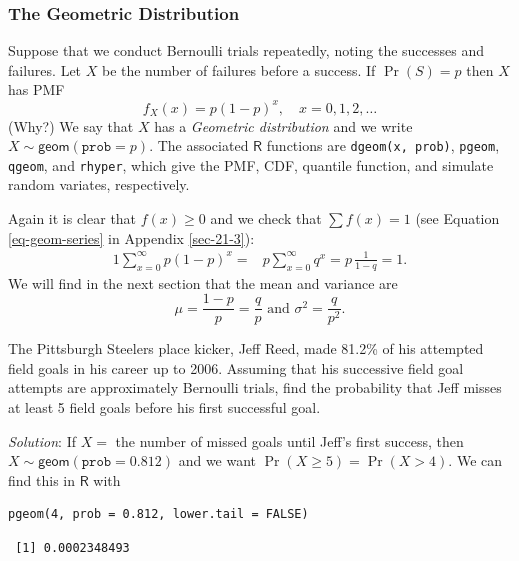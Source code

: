 \documentclass[captions=tableheading]{scrbook}
\begin{document}
\subsubsection{The Geometric Distribution}
\label{sec-5-6-2-1}
\label{sub-The-Geometric-Distribution}


Suppose that we conduct Bernoulli trials repeatedly, noting the successes and failures. Let \(X\) be the number of failures before a success. If \(\Pr(S)=p\) then \(X\) has PMF
\begin{equation}
f_{X}(x)=p(1-p)^{x},\quad x=0,1,2,\ldots
\end{equation}
(Why?) We say that \(X\) has a \emph{Geometric distribution} and we write \(X\sim\mathsf{geom}(\mathtt{prob}=p)\). The associated \(\mathsf{R}\) functions are \texttt{dgeom(x, prob)}, \texttt{pgeom}, \texttt{qgeom}, and \texttt{rhyper}, which give the PMF, CDF, quantile function, and simulate random variates, respectively.

Again it is clear that \(f(x)\geq0\) and we check that \(\sum f(x)=1\) (see Equation \ref{eq-geom-series} in Appendix \ref{sec-21-3}):
\begin{alignat*}{1}
\sum_{x=0}^{\infty}p(1-p)^{x}= & p\sum_{x=0}^{\infty}q^{x}=p\,\frac{1}{1-q}=1.
\end{alignat*}
We will find in the next section that the mean and variance are
\begin{equation}
\mu=\frac{1-p}{p}=\frac{q}{p}\mbox{ and }\sigma^{2}=\frac{q}{p^{2}}.
\end{equation}


\begin{example}
The Pittsburgh Steelers place kicker, Jeff Reed, made 81.2\% of his attempted field goals in his career up to 2006. Assuming that his successive field goal attempts are approximately Bernoulli trials, find the probability that Jeff misses at least 5 field goals before his first successful goal.

\emph{Solution}: If \(X=\) the number of missed goals until Jeff's first success, then \(X\sim\mathsf{geom}(\mathtt{prob}=0.812)\) and we want \(\Pr(X\geq5)=\Pr(X>4)\). We can find this in \(\mathsf{R}\) with


\begin{verbatim}
pgeom(4, prob = 0.812, lower.tail = FALSE)
\end{verbatim}

\begin{verbatim}
 [1] 0.0002348493
\end{verbatim}

\end{example}
\end{document}

